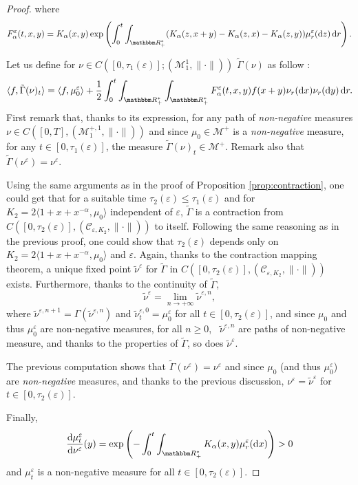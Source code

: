 \documentclass[a4paper,11pt, reqno]{amsart}
\newcommand{\cC}{\mathcal{C}}	\newcommand{\CC}{\mathbbm{C}}
\newcommand{\cM}{\mathcal{M}}	\newcommand{\MM}{\mathbbm{M}}
\newcommand{\eps}{\varepsilon}
\newcommand{\dd}{\mathop{}\!\mathrm{d}}
\newcommand{\1}{\mathbbm{1}}
\theoremstyle{plain}
\theoremstyle{definition}
\begin{document}
\begin{proof}
  where
  \[ F_{\alpha}^{\eps} (t, x, y) = K_{\alpha} (x, y) \exp \left(
     \int_0^t \int_{\RR^{\ast}_+} (K_{\alpha} (z, x + y) - K_{\alpha}
     (z, x) - K_{\alpha} (z, y)) \mu_r^{\eps} (\dd z) \dd r
     \right) . \]
  
  
  Let us define for $\nu \in C ([0, \tau_1 (\eps)] ; (\cM_1^1,
  \| \cdot \|))$ $\tilde{\Gamma} (\nu)$ as follow :
  \[ \langle f, \tilde{\Gamma} (\nu)_t \rangle = \langle f,
     \mu_0^{\eps} \rangle + \frac{1}{2} \int_0^t
     \int_{\RR^{\ast}_+} \int_{\RR^{\ast}_+}
     F_{\alpha}^{\eps} (t, x, y) f (x + y) \nu_r (\dd x) \nu_r
     (\dd y) \dd r. \]
  First remark that, thanks to its expression, for any path of
  \emph{non-negative} measures $\nu \in C ([0, T], (\cM_1^{+, 1},
  \| \cdot \|))$ and since $\mu_0 \in \cM^+$ is a
  \emph{non-negative} measure, for any $t \in [0, \tau_1 (\eps)]$,
  the measure $\tilde{\Gamma} (\nu)_t \in \cM^+$. Remark also that
  $\tilde{\Gamma} (\nu^{\eps}) = \nu^{\eps}$.
  
  Using the same arguments as in the proof of Proposition
  \ref{prop:contraction}, one could get that for a suitable time $\tau_2
  (\eps) \le \tau_1 (\eps)$ and for $K_2 = 2 \langle 1 + x
  + x^{- \alpha}, \mu_0 \rangle$ independent of $\eps$,
  $\tilde{\Gamma}$ is a contraction from $C ([0, \tau_2 (\eps)],
  (\cC_{\eps, K_2}, \| \cdot \|))$ to itself. Following the
  same reasoning as in the previous proof, one could show that $\tau_2
  (\eps)$ depends only on $K_2 = 2 \langle 1 + x + x^{- \alpha}, \mu_0
  \rangle$ and $\eps$. Again, thanks to the contraction mapping
  theorem, a unique fixed point $\tilde{\nu}^{\eps}$ for
  $\tilde{\Gamma}$ in $C ([0, \tau_2 (\eps)],
  (\cC_{\eps, K_2}, \| \cdot \|))$ exists. Furthermore,
  thanks to the continuity of $\tilde{\Gamma}$,
  \[ \tilde{\nu}^{\eps} = \underset{n \rightarrow + \infty}{\lim}
     \tilde{\nu}^{\eps, n}, \]
  where $\tilde{\nu}^{\eps, n + 1} = \Gamma (\tilde{\nu}^{\eps,
  n})$ and $\tilde{\nu}^{\eps, 0}_t = \mu^{\eps}_0$ for all $t
  \in [0, \tau_2 (\eps)]$, and since $\mu_0$ and thus
  $\mu_0^{\eps}$ are non-negative measures, for all $n \ge 0$, \
  $\tilde{\nu}^{\eps, n}$ are paths of non-negative measure, and thanks
  to the properties of $\tilde{\Gamma}$, so does $\tilde{\nu}^{\eps}$.
  
  The previous computation shows that $\tilde{\Gamma} (\nu^{\eps}) =
  \nu^{\eps}$ and since $\mu_0$ (and thus $\mu_0^{\eps}$) are
  \emph{non-negative} measures, and thanks to the previous discussion,
  $\nu^{\eps} = \tilde{\nu}^{\eps}$ for $t \in [0, \tau_2
  (\eps)]$.
  
  Finally,
  \[ \frac{\dd \mu^{\eps}_t}{\dd \nu^{\eps}} (y) = \exp
     \left( - \int_0^t \int_{\RR^{\ast}_+} K_{\alpha} (x, y)
     \mu_r^{\eps} (\dd x) \right) > 0 \]
  and $\mu^{\eps}_t$ is a non-negative measure for all $t \in [0,
  \tau_2 (\eps)]$.
\end{proof}
\end{document}
